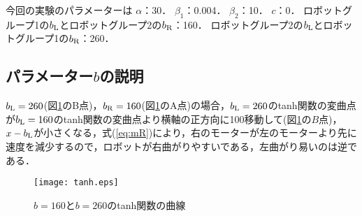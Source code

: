 今回の実験のパラメーターは
$\alpha$：30．
$\beta_1$：0.004．
$\beta_2$：10．
$c$：0．
ロボットグループ1の$b_{\rm L}$とロボットグループ2の$b_{\rm R}$：160．
ロボットグループ2の$b_{\rm L}$とロボットグループ1の$b_{\rm R}$：260．

\subsection{パラメーター$b$の説明}
$b_{\rm L}=260$(図\ref{fitan}のB点)，$b_{\rm R}=160$(図\ref{fitan}のA点)の場合，$b_{\rm L}=260$のtanh関数の変曲点が$b_{\rm L}=160$のtanh関数の変曲点より横軸の正方向に100移動して(図\ref{fitan}の$B$点)，$x-b_{\rm L}$が小さくなる，式(\ref{eq:mR})により，右のモーターが左のモーターより先に速度を減少するので，ロボットが右曲がりやすいである，左曲がり易いのは逆である．
\vspace{-9mm}
\begin{figure}[!ht]
    \centering
    \texttt{[image: tanh.eps]} 
    \caption{$b=160$と$b=260$のtanh関数の曲線}
    \label{fitan}
\end{figure}

